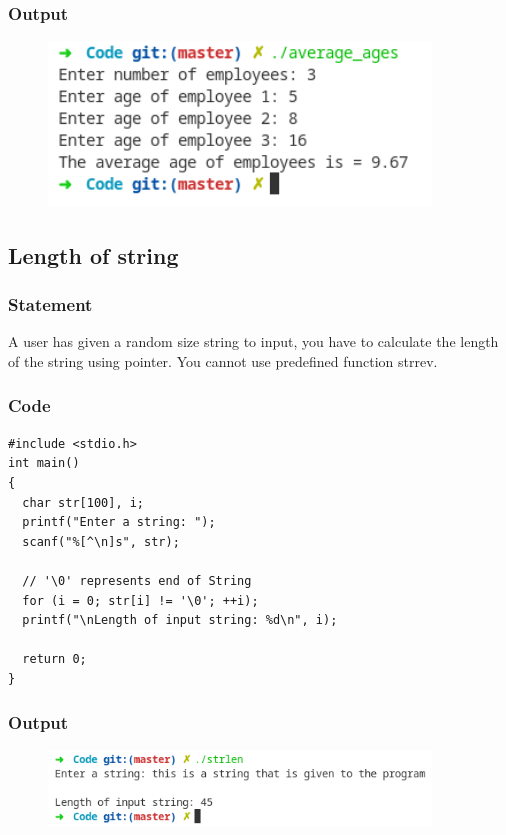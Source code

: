 \pagebreak
\subsubsection{Output}
\begin{figure}[!htb]
  \centering
  \includegraphics[width=4in]{Images/average.png}
  \label{output:2}
\end{figure}


\pagebreak
\subsection{Length of string}

\subsubsection{Statement}
A user has given a random size string to input, you have to calculate the length of the
string using pointer. You cannot use predefined function strrev.

\subsubsection{Code}
\begin{verbatim} 
#include <stdio.h>
int main()
{
  char str[100], i;
  printf("Enter a string: ");
  scanf("%[^\n]s", str);

  // '\0' represents end of String
  for (i = 0; str[i] != '\0'; ++i);
  printf("\nLength of input string: %d\n", i);

  return 0;
}
\end{verbatim}
\subsubsection{Output}
\begin{figure}[!htb]
  \centering
  \includegraphics[width=4in]{Images/strlen.png}
  \label{output:3}
\end{figure}

